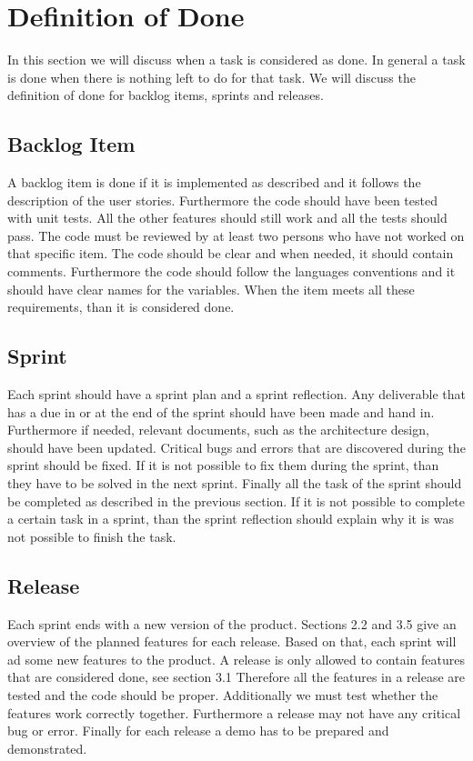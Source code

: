 \section{Definition of Done}
\label{sec: Definition-of-Done}
In this section we will discuss when a task is considered as done. In general a task is done when there is nothing left to do for that task. We will discuss the definition of done for backlog items, sprints and releases.

\subsection{Backlog Item}
A backlog item is done if it is implemented as described and it follows the description of the user stories. Furthermore the code should have been tested with unit tests. All the other features should still work and all the tests should pass. The code must be reviewed by at least two persons who have not worked on that specific item. The code should be clear and when needed, it should contain comments. Furthermore the code should follow the languages conventions and it should have clear names for the variables. When the item meets all these requirements, than it is considered done.

\subsection{Sprint}
Each sprint should have a sprint plan and a sprint reflection. Any deliverable that has a due in or at the end of the sprint should have been made and hand in. Furthermore  if needed, relevant documents, such as the architecture design, should have been updated. Critical bugs and errors that are discovered during the sprint should be fixed. If it is not possible to fix them during the sprint, than they have to be solved in the next sprint. Finally all the task of the sprint should be completed as described in the previous section. If it is not possible to complete a certain task in a sprint, than the sprint reflection should explain why it is was not possible to finish the task.

\subsection{Release}
Each sprint ends with a new version of the product. Sections 2.2 and 3.5 give an overview of the planned features for each release. Based on that, each sprint will ad some new features to the product.
A release is only allowed to contain features that are considered done, see section 3.1 Therefore all the features in a release are tested and the code should be proper. Additionally we must test whether the features work correctly together. Furthermore a release may not have any critical bug or error. Finally for each release a demo has to be prepared and demonstrated. 